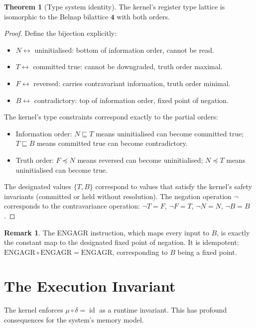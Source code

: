 \documentclass[11pt,a4paper]{article}
\theoremstyle{definition}
\newtheorem{theorem}{Theorem}[section]
\newtheorem{remark}{Remark}[section]
\newcommand{\id}{\operatorname{id}}
\begin{document}
\begin{theorem}[Type system identity]
The kernel's register type lattice is isomorphic to the Belnap bilattice $\mathbf{4}$ with both orders.
\end{theorem}

\begin{proof}
Define the bijection explicitly:
\begin{itemize}
\item $N \leftrightarrow$ uninitialised: bottom of information order, cannot be read.
\item $T \leftrightarrow$ committed true: cannot be downgraded, truth order maximal.
\item $F \leftrightarrow$ reversed: carries contravariant information, truth order minimal.
\item $B \leftrightarrow$ contradictory: top of information order, fixed point of negation.
\end{itemize}
The kernel's type constraints correspond exactly to the partial orders:
\begin{itemize}
\item Information order: $N \sqsubseteq T$ means uninitialised can become committed true; $T \sqsubseteq B$ means committed true can become contradictory.
\item Truth order: $F \preceq N$ means reversed can become uninitialised; $N \preceq T$ means uninitialised can become true.
\end{itemize}
The designated values $\{T,B\}$ correspond to values that satisfy the kernel's safety invariants (committed or held without resolution). The negation operation $\neg$ corresponds to the contravariance operation: $\neg T = F$, $\neg F = T$, $\neg N = N$, $\neg B = B$.
\end{proof}

\begin{remark}
The ENGAGR instruction, which maps every input to $B$, is exactly the constant map to the designated fixed point of negation. It is idempotent: $\text{ENGAGR} \circ \text{ENGAGR} = \text{ENGAGR}$, corresponding to $B$ being a fixed point.
\end{remark}

\section{The Execution Invariant}

The kernel enforces $\mu \circ \delta = \id$ as a runtime invariant. This has profound consequences for the system's memory model.
\end{document}
